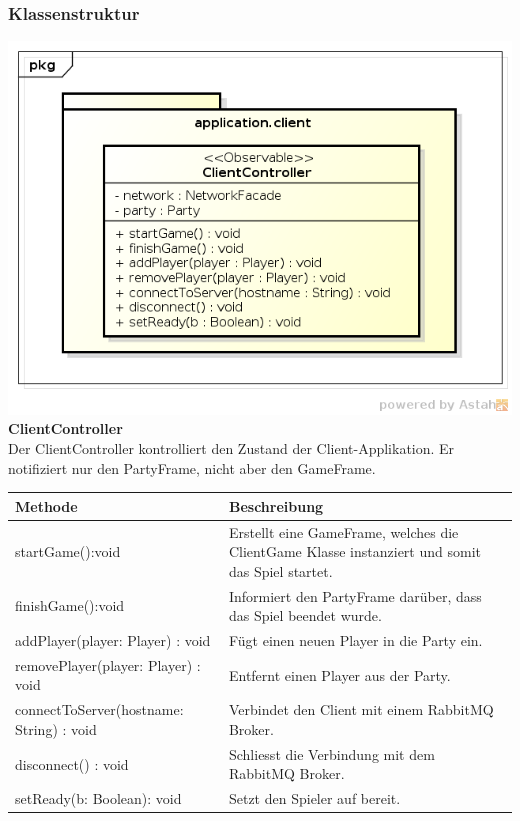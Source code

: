 \documentclass[11pt]{scrartcl}
\begin{document}
\subsubsection{Klassenstruktur}
\includegraphics[scale=0.75]{ClassDiagramApplicationClient}
\newpage
\textbf{ClientController}\\
Der ClientController kontrolliert den Zustand der Client-Applikation. Er notifiziert nur den PartyFrame, nicht aber den GameFrame.\\
\begin{table}[!h]
\begin{tabularx}{\linewidth}{l X}
\textbf{Methode} & \textbf{Beschreibung}\\
\hline
startGame():void & Erstellt eine GameFrame, welches die ClientGame Klasse instanziert und somit das Spiel startet.\\
finishGame():void & Informiert den PartyFrame darüber, dass das Spiel beendet wurde.\\
addPlayer(player: Player) : void & Fügt einen neuen Player in die Party ein.\\
removePlayer(player: Player) : void & Entfernt einen Player aus der Party.\\
connectToServer(hostname: String) : void & Verbindet den Client mit einem RabbitMQ Broker.\\
disconnect() : void & Schliesst die Verbindung mit dem RabbitMQ Broker.\\
setReady(b: Boolean): void & Setzt den Spieler auf bereit.\\

\end{tabularx}
\end{table}
\end{document}
